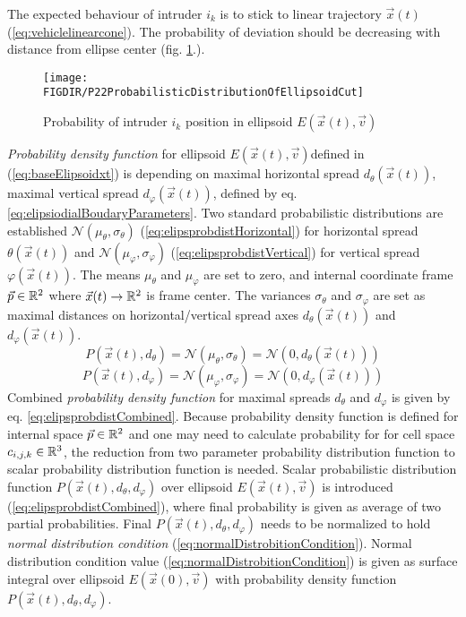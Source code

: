 \noindent The expected behaviour of intruder $i_k$ is to stick to linear trajectory $\vec{x}(t)$ (\ref{eq:vehiclelinearcone}). The probability of deviation should be decreasing with distance from ellipse center (fig. \ref{fig:P22ProbabilisticDistributionOfEllipsoidCut}.).  
\begin{figure}[H]
    \centering
    \texttt{[image: \\FIGDIR/P22ProbabilisticDistributionOfEllipsoidCut]}
    \caption{Probability of intruder $i_k$ position in ellipsoid $E(\vec{x}(t),\vec{v})$}
    \label{fig:P22ProbabilisticDistributionOfEllipsoidCut}
\end{figure}
\noindent \emph{Probability density function} for ellipsoid  $E(\vec{x}(t),\vec{v})$defined in (\ref{eq:baseElipsoidxt}) is depending on maximal horizontal spread $d_\theta(\vec{x}(t))$, maximal vertical spread $d_\varphi(\vec{x}(t))$, defined by eq. \ref{eq:elipsiodialBoudaryParameters}. Two standard probabilistic distributions are established $\mathscr{N}(\mu_\theta,\sigma_\theta)$ (\ref{eq:elipsprobdistHorizontal}) for horizontal spread $\theta(\vec{x}(t))$ and $\mathscr{N}(\mu_\varphi,\sigma_\varphi)$  (\ref{eq:elipsprobdistVertical}) for vertical spread $\varphi(\vec{x}(t))$. The means $\mu_\theta$ and $\mu_\varphi$ are set to zero, and internal coordinate frame $\vec{p}\in\mathbb{R}^2$ where $\vec{x}(t)\to\mathbb{R}^2$ is frame center. The variances $\sigma_\theta$ and $\sigma_\varphi$ are set as maximal distances on horizontal/vertical spread axes $d_\theta(\vec{x}(t))$ and $d_\varphi(\vec{x}(t))$.
\begin{equation}\label{eq:elipsprobdistHorizontal}
    P(\vec{x}(t),d_\theta)=\mathscr{N}(\mu_\theta,\sigma_\theta)=\mathscr{N}(0,d_\theta(\vec{x}(t)))
\end{equation}
\begin{equation}\label{eq:elipsprobdistVertical}
    P(\vec{x}(t),d_\varphi)=\mathscr{N}(\mu_\varphi,\sigma_\varphi)=\mathscr{N}(0,d_\varphi(\vec{x}(t)))
\end{equation}
\noindent Combined \emph{probability density function} for maximal spreads $d_\theta$ and $d_\varphi$ is given by eq. \ref{eq:elipsprobdistCombined}. Because probability density function is defined for internal space $\vec{p}\in\mathbb{R}^2$ and one may need to calculate probability for for cell space $c_{i,j,k}\in\mathbb{R}^3$, the reduction from two parameter probability distribution function to scalar probability distribution function is needed. Scalar probabilistic distribution  function $P(\vec{x}(t),d_\theta,d_\varphi)$ over ellipsoid $E(\vec{x}(t),\vec{v})$ is introduced (\ref{eq:elipsprobdistCombined}), where final probability is given as average of two partial probabilities. Final $P(\vec{x}(t),d_\theta,d_\varphi)$ needs to be normalized to hold \emph{normal distribution condition} (\ref{eq:normalDistrobitionCondition}). Normal distribution condition value (\ref{eq:normalDistrobitionCondition}) is given as surface integral over ellipsoid $E(\vec{x}(0),\vec{v})$ with probability density function $P(\vec{x}(t),d_\theta,d_\varphi)$.
